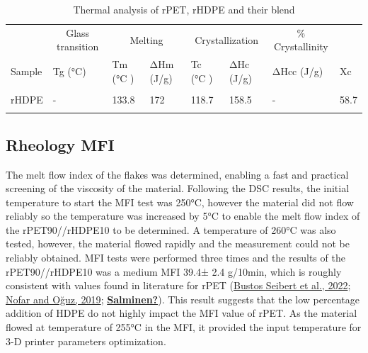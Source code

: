 \documentclass[
  12pt,
  number,
  review]{elsarticle}
\begin{document}
\begin{table}
\caption{Thermal analysis of rPET, rHDPE and their blend}\tabularnewline

\centering\begingroup\fontsize{7}{9}\selectfont

\begin{tabular}[t]{llllllll}
\toprule
\multicolumn{1}{c}{ } & \multicolumn{1}{c}{Glass transition} & \multicolumn{2}{c}{Melting} & \multicolumn{2}{c}{Crystallization } & \multicolumn{1}{c}{\% Crystallinity} \\
\cmidrule(l{3pt}r{3pt}){2-2} \cmidrule(l{3pt}r{3pt}){3-4} \cmidrule(l{3pt}r{3pt}){5-6} \cmidrule(l{3pt}r{3pt}){7-7}
Sample & Tg (°C) & Tm  (°C ) & ΔHm (J/g) & Tc  (°C ) & ΔHc (J/g) & ΔHcc (J/g) & Xc\\
\midrule
\cellcolor{gray!6}{rPET} & \cellcolor{gray!6}{82} & \cellcolor{gray!6}{249.9} & \cellcolor{gray!6}{31.6} & \cellcolor{gray!6}{196.7} & \cellcolor{gray!6}{34.8} & \cellcolor{gray!6}{-} & \cellcolor{gray!6}{22.6}\\
rHDPE & - & 133.8 & 172 & 118.7 & 158.5 & - & 58.7\\
\cellcolor{gray!6}{rPET90/rHDPE10} & \cellcolor{gray!6}{77 / -} & \cellcolor{gray!6}{254/131.7} & \cellcolor{gray!6}{40.3/1.30} & \cellcolor{gray!6}{210.6/117.4} & \cellcolor{gray!6}{37.9/6.7} & \cellcolor{gray!6}{6.8} & \cellcolor{gray!6}{24.8 / 18.4}\\
\bottomrule
\end{tabular}
\endgroup{}
\end{table}

\hypertarget{rheology-mfi}{%
\subsection{Rheology MFI}\label{rheology-mfi}}

The melt flow index of the flakes was determined, enabling a fast and
practical screening of the viscosity of the material. Following the DSC
results, the initial temperature to start the MFI test was 250°C,
however the material did not flow reliably so the temperature was
increased by 5°C to enable the melt flow index of the rPET90//rHDPE10 to
be determined. A temperature of 260°C was also tested, however, the
material flowed rapidly and the measurement could not be reliably
obtained. MFI tests were performed three times and the results of the
rPET90//rHDPE10 was a medium MFI 39.4± 2.4 g/10min, which is roughly
consistent with values found in literature for rPET
(\protect\hyperlink{ref-bustosseibert2022}{Bustos Seibert et al., 2022};
\protect\hyperlink{ref-nofar2019}{Nofar and Oğuz, 2019};
\protect\hyperlink{ref-Salminen}{\textbf{Salminen?}}). This result
suggests that the low percentage addition of HDPE do not highly impact
the MFI value of rPET. As the material flowed at temperature of 255°C in
the MFI, it provided the input temperature for 3-D printer parameters
optimization.
\end{document}
